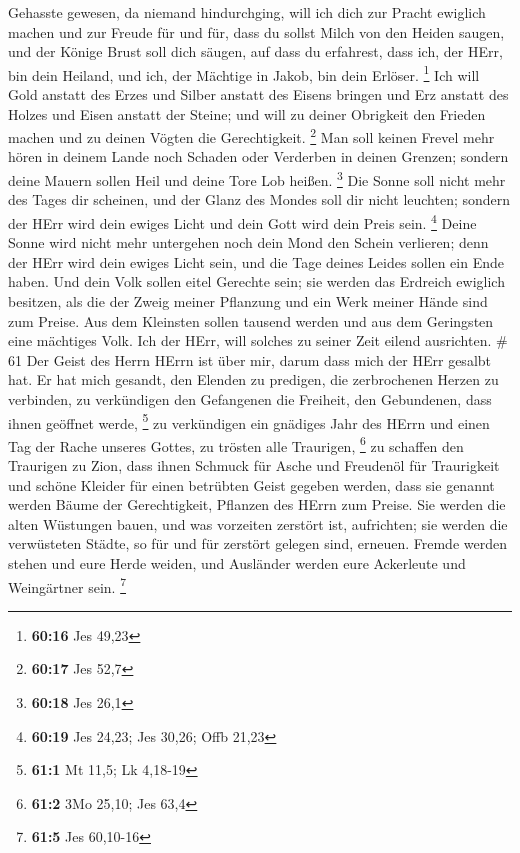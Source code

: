 Gehasste gewesen, da niemand hindurchging, will ich dich zur Pracht
ewiglich machen und zur Freude für und für,  dass du sollst
Milch von den Heiden saugen, und der Könige Brust soll dich säugen, auf
dass du erfahrest, dass ich, der HErr, bin dein Heiland, und ich, der
Mächtige in Jakob, bin dein Erlöser. \footnote{\textbf{60:16} Jes 49,23}
 Ich will Gold anstatt des Erzes und Silber anstatt des
Eisens bringen und Erz anstatt des Holzes und Eisen anstatt der Steine;
und will zu deiner Obrigkeit den Frieden machen und zu deinen Vögten die
Gerechtigkeit. \footnote{\textbf{60:17} Jes 52,7}  Man soll
keinen Frevel mehr hören in deinem Lande noch Schaden oder Verderben in
deinen Grenzen; sondern deine Mauern sollen Heil und deine Tore Lob
heißen. \footnote{\textbf{60:18} Jes 26,1}  Die Sonne soll
nicht mehr des Tages dir scheinen, und der Glanz des Mondes soll dir
nicht leuchten; sondern der HErr wird dein ewiges Licht und dein Gott
wird dein Preis sein. \footnote{\textbf{60:19} Jes 24,23; Jes 30,26;
  Offb 21,23}  Deine Sonne wird nicht mehr untergehen noch
dein Mond den Schein verlieren; denn der HErr wird dein ewiges Licht
sein, und die Tage deines Leides sollen ein Ende haben. 
Und dein Volk sollen eitel Gerechte sein; sie werden das Erdreich
ewiglich besitzen, als die der Zweig meiner Pflanzung und ein Werk
meiner Hände sind zum Preise.  Aus dem Kleinsten sollen
tausend werden und aus dem Geringsten eine mächtiges Volk. Ich der HErr,
will solches zu seiner Zeit eilend ausrichten. \# 61  Der
Geist des Herrn HErrn ist über mir, darum dass mich der HErr gesalbt
hat. Er hat mich gesandt, den Elenden zu predigen, die zerbrochenen
Herzen zu verbinden, zu verkündigen den Gefangenen die Freiheit, den
Gebundenen, dass ihnen geöffnet werde, \footnote{\textbf{61:1} Mt 11,5;
  Lk 4,18-19}  zu verkündigen ein gnädiges Jahr des HErrn
und einen Tag der Rache unseres Gottes, zu trösten alle Traurigen,
\footnote{\textbf{61:2} 3Mo 25,10; Jes 63,4}  zu schaffen
den Traurigen zu Zion, dass ihnen Schmuck für Asche und Freudenöl für
Traurigkeit und schöne Kleider für einen betrübten Geist gegeben werden,
dass sie genannt werden Bäume der Gerechtigkeit, Pflanzen des HErrn zum
Preise.  Sie werden die alten Wüstungen bauen, und was
vorzeiten zerstört ist, aufrichten; sie werden die verwüsteten Städte,
so für und für zerstört gelegen sind, erneuen.  Fremde
werden stehen und eure Herde weiden, und Ausländer werden eure
Ackerleute und Weingärtner sein. \footnote{\textbf{61:5} Jes 60,10-16}
